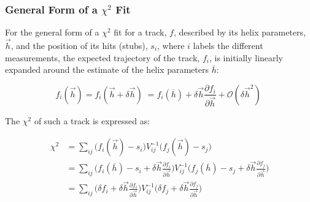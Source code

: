 
\subsubsection{General Form of a $\chi^{2}$ Fit}\label{subsubsec:chi2maths}
For the general form of a $\chi^{2}$ fit for a track, $f$, described by its helix parameters, $\overrightarrow{h}$, and the position of its hits (\ie stubs), $s_{i}$, where $i$ labels the different measurements, the expected trajectory of the track, $f_{i}$, is initially linearly expanded around the estimate of the helix parameters $\overline{h}$:

\begin{equation}
f_{i}(\overrightarrow{h} ) = f_{i}(\overrightarrow{h} + \delta \overrightarrow{h}) \;
                           = f_{i}(\overline{h}) + \delta \overrightarrow{h} \frac{\partial f_{i}}{\partial \overrightarrow{h}} + \mathcal{O}(\delta \overrightarrow{h}^{2}) \;
\label{eq:chi1}
\end{equation}

The $\chi^{2}$ of such a track is expressed as:

\begin{equation}
\begin{split}
\chi^{2} &= \sum_{ij} \big(f_{i}(\overrightarrow{h}) - s_{i} \big) V^{-1}_{ij}  \big(f_{j}(\overrightarrow{h}) - s_{j} \big)  \\
         &= \sum_{ij} \big( f_{i}(\overline{h})  - s_{i} + \delta \overrightarrow{h} \frac{\partial f_{i}}{\partial \overrightarrow{h}} \big) V^{-1}_{ij}  \big( f_{j}(\overline{h})  - s_{j} + \delta \overrightarrow{h} \frac{\partial f_{j}}{\partial \overrightarrow{h}} \big)  \\
         &= \sum_{ij} \big( \delta f_{i} + \delta \overrightarrow{h} \frac{\partial f_{i}}{\partial \overrightarrow{h}} \big) V^{-1}_{ij}  \big( \delta f_{j} + \delta \overrightarrow{h} \frac{\partial f_{j}}{\partial \overrightarrow{h}} \big)
\end{split}
\label{eq:chi2}
\end{equation}

